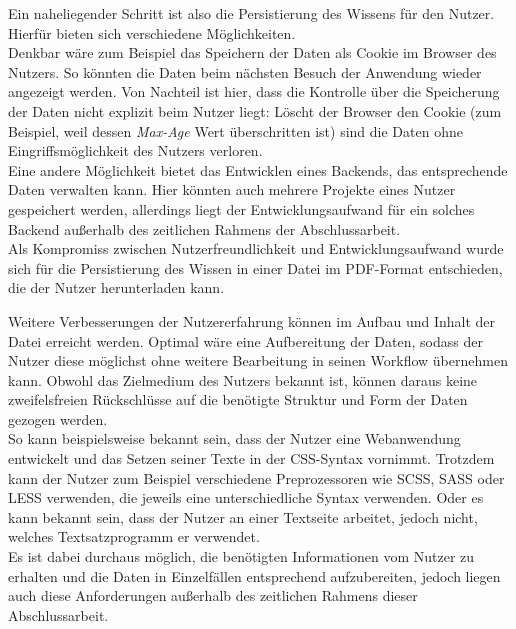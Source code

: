 Ein naheliegender Schritt ist also die Persistierung des Wissens für den Nutzer. Hierfür bieten sich verschiedene Möglichkeiten. \\
Denkbar wäre zum Beispiel das Speichern der Daten als Cookie\footnotemark{} im Browser des Nutzers. So könnten die Daten beim nächsten Besuch der Anwendung wieder angezeigt werden.
Von Nachteil ist hier, dass die Kontrolle über die Speicherung der Daten nicht explizit beim Nutzer liegt: Löscht der Browser den Cookie (zum Beispiel, weil dessen \textit{Max-Age}\footnotemark{} Wert überschritten ist) sind die Daten ohne Eingriffsmöglichkeit des Nutzers verloren.\\
Eine andere Möglichkeit bietet das Entwicklen eines Backends, das entsprechende Daten verwalten kann. Hier könnten auch mehrere Projekte eines Nutzer gespeichert werden, allerdings liegt der Entwicklungsaufwand für ein solches Backend außerhalb des zeitlichen Rahmens der Abschlussarbeit. \\
Als Kompromiss zwischen Nutzerfreundlichkeit und Entwicklungsaufwand wurde sich für die Persistierung des Wissen in einer Datei im PDF-Format entschieden, die der Nutzer herunterladen kann.


Weitere Verbesserungen der Nutzererfahrung können im Aufbau und Inhalt der Datei erreicht werden. Optimal wäre eine Aufbereitung der Daten, sodass der Nutzer diese möglichst ohne weitere Bearbeitung in seinen Workflow übernehmen kann. Obwohl das Zielmedium des Nutzers bekannt ist, können daraus keine zweifelsfreien Rückschlüsse auf die benötigte Struktur und Form der Daten gezogen werden. \\
So kann beispielsweise bekannt sein, dass der Nutzer eine Webanwendung entwickelt und das Setzen seiner Texte in der CSS-Syntax vornimmt. Trotzdem kann der Nutzer zum Beispiel verschiedene Preprozessoren wie SCSS, SASS oder LESS verwenden, die jeweils eine unterschiedliche Syntax verwenden.
Oder es kann bekannt sein, dass der Nutzer an einer Textseite arbeitet, jedoch nicht, welches Textsatzprogramm er verwendet\footnotemark{}.\\
Es ist dabei durchaus möglich, die benötigten Informationen vom Nutzer zu erhalten und die Daten in Einzelfällen entsprechend aufzubereiten, jedoch liegen auch diese Anforderungen außerhalb des zeitlichen Rahmens dieser Abschlussarbeit.
